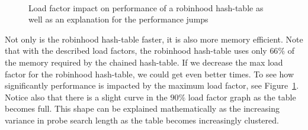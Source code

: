 \documentclass[a4paper, 12pt]{article}
\begin{document}
 \begin{figure}[ht]
     \centering
    ~
    \caption{Load factor impact on performance of a robinhood hash-table as well as an explanation for the performance jumps}
    \label{fig:load}
 \end{figure}

\medskip
Not only is the robinhood hash-table faster, it is also more memory efficient. Note that with the described load factors, the robinhood hash-table uses only $66\%$ of the memory required by the chained hash-table. If we decrease the max load factor for the robinhood hash-table, we could get even better times. To see how significantly performance is impacted by the maximum load factor, see Figure~\ref{fig:load}. Notice also that there is a slight curve in the $90\%$ load factor graph as the table becomes full. This shape can be explained mathematically as the increasing variance in probe search length as the table becomes increasingly clustered.
\end{document}
